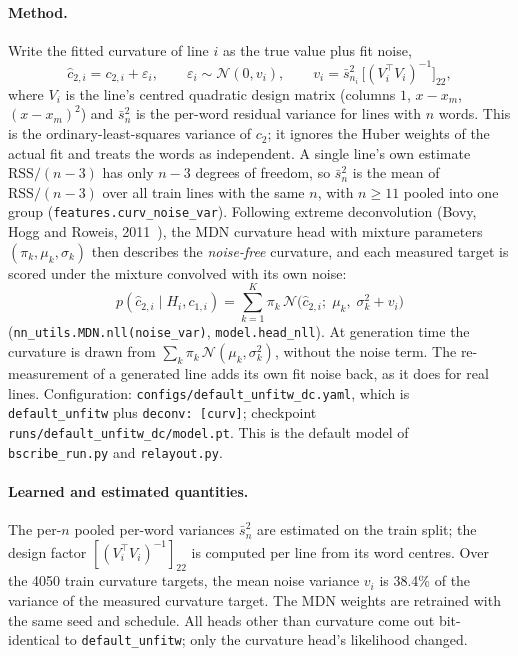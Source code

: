 \documentclass[11pt,a4paper]{article}
\begin{document}
\paragraph{Method.} Write the fitted curvature of line $i$ as the true value
plus fit noise,
\begin{equation}
\hat c_{2,i} = c_{2,i} + \varepsilon_i,\qquad
\varepsilon_i\sim\mathcal N(0,v_i),\qquad
v_i = \bar s^2_{n_i}\,\big[(V_i^\top V_i)^{-1}\big]_{22},
\label{eq:curvnoise}
\end{equation}
where $V_i$ is the line's centred quadratic design matrix (columns $1$,
$x-x_m$, $(x-x_m)^2$) and $\bar s^2_n$ is the per-word residual variance for
lines with $n$ words. This is the ordinary-least-squares variance of $c_2$; it
ignores the Huber weights of the actual fit and treats the words as
independent. A single line's own estimate $\text{RSS}/(n-3)$ has only $n-3$
degrees of freedom, so $\bar s^2_n$ is the mean of $\text{RSS}/(n-3)$ over all
train lines with the same $n$, with $n\ge11$ pooled into one group
(\texttt{features.curv\_noise\_var}). Following extreme deconvolution (Bovy,
Hogg and Roweis, 2011~\cite{bovy2011}), the MDN curvature head with mixture
parameters $(\pi_k,\mu_k,\sigma_k)$ then describes the \emph{noise-free}
curvature, and each measured target is scored under the mixture convolved with
its own noise:
\begin{equation}
p(\hat c_{2,i}\mid H_i,c_{1,i}) =
\sum_{k=1}^{K}\pi_k\,\mathcal N\!\big(\hat c_{2,i};\;\mu_k,\;\sigma_k^2+v_i\big)
\label{eq:xd}
\end{equation}
(\texttt{nn\_utils.MDN.nll(noise\_var)}, \texttt{model.head\_nll}). At
generation time the curvature is drawn from
$\sum_k\pi_k\,\mathcal N(\mu_k,\sigma_k^2)$, without the noise term. The
re-measurement of a generated line adds its own fit noise back, as it does for
real lines. Configuration: \texttt{configs/default\_unfitw\_dc.yaml}, which is
\texttt{default\_unfitw} plus \texttt{deconv: [curv]}; checkpoint
\texttt{runs/default\_unfitw\_dc/model.pt}. This is the default model of
\texttt{bscribe\_run.py} and \texttt{relayout.py}.

\paragraph{Learned and estimated quantities.} The per-$n$ pooled per-word
variances $\bar s^2_n$ are estimated on the train split; the design factor
$[(V_i^\top V_i)^{-1}]_{22}$ is computed per line from its word centres. Over
the 4050 train curvature targets, the mean noise variance $v_i$ is 38.4\% of
the variance of the measured curvature target. The MDN weights are retrained
with the same seed and schedule. All heads other than curvature come out
bit-identical to \texttt{default\_unfitw}; only the curvature head's
likelihood changed.
\end{document}
